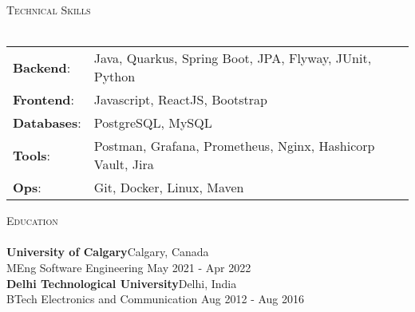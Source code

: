 \documentclass[a4paper]{article}
\newcommand{\lineunder} {
    \vspace*{-8pt} \\
    \hspace*{-18pt} \hrulefill \\
}
\newcommand{\header} [1] {
    {\hspace*{-18pt}\vspace*{6pt} \textsc{#1}}
    \vspace*{-6pt} \lineunder
}
\begin{document}
\header{Technical Skills}
\vspace{1mm}
\begin{tabular}{ l l }
    \textbf{Backend}:   & Java, Quarkus, Spring Boot, JPA, Flyway, JUnit, Python                        \\
    \textbf{Frontend}:  & Javascript, ReactJS, Bootstrap                                                \\
    \textbf{Databases}: & PostgreSQL, MySQL                                                             \\
    \textbf{Tools}:     & Postman, Grafana, Prometheus, Nginx, Hashicorp Vault, Jira                    \\
    \textbf{Ops}:       & Git, Docker, Linux, Maven                                                     \\
\end{tabular}
\vspace{2mm}


\header{Education}
\vspace{1mm}
\textbf{University of Calgary}\hfill Calgary, Canada\\
MEng Software Engineering \hfill May 2021 - Apr 2022\\
\vspace{2mm}
\textbf{Delhi Technological University}\hfill Delhi, India\\
BTech Electronics and Communication \hfill Aug 2012 - Aug 2016\\
\vspace{2mm}


\
\end{document}
